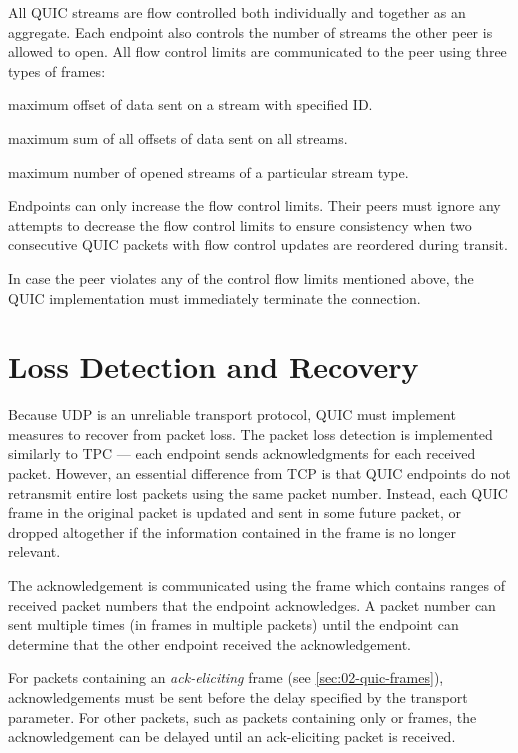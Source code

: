 All QUIC streams are flow controlled both individually and together as an aggregate. Each endpoint
also controls the number of streams the other peer is allowed to open. All flow control limits are
communicated to the peer using three types of frames:

\begin{itemize}

\litem{\MAXSTREAMDATA{}} maximum offset of data sent on a stream with specified ID\@.

\litem{\MAXDATA{}} maximum sum of all offsets of data sent on all streams.

\litem{\MAXSTREAMS{}} maximum number of opened streams of a particular stream type.

\end{itemize}

Endpoints can only increase the flow control limits. Their peers must ignore any attempts to
decrease the flow control limits to ensure consistency when two consecutive QUIC packets with flow
control updates are reordered during transit.

In case the peer violates any of the control flow limits mentioned above, the QUIC implementation
must immediately terminate the connection.

\section{Loss Detection and Recovery}

Because UDP is an unreliable transport protocol, QUIC must implement measures to recover from packet
loss. The packet loss detection is implemented similarly to TPC --- each endpoint sends
acknowledgments for each received packet. However, an essential difference from TCP is that QUIC
endpoints do not retransmit entire lost packets using the same packet number. Instead, each QUIC
frame in the original packet is updated and sent in some future packet, or dropped altogether if the
information contained in the frame is no longer relevant.

The acknowledgement is communicated using the \ACK{} frame which contains ranges of received packet
numbers that the endpoint acknowledges. A packet number can sent multiple times (in \ACK{} frames in
multiple packets) until the endpoint can determine that the other endpoint received the
acknowledgement.

For packets containing an \textit{ack-eliciting} frame (see \autoref{sec:02-quic-frames}),
acknowledgements must be sent before the delay specified by the \MaxAckDelay{} transport
parameter. For other packets, such as packets containing only \ACK{} or \PADDING{} frames, the
acknowledgement can be delayed until an ack-eliciting packet is received.

